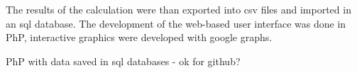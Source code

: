 The results of the calculation were than exported into csv files and imported
in an sql database. The development of the web-based user interface was done in PhP, interactive
graphics were developed with google graphs.

PhP with data saved in sql databases - ok for github?